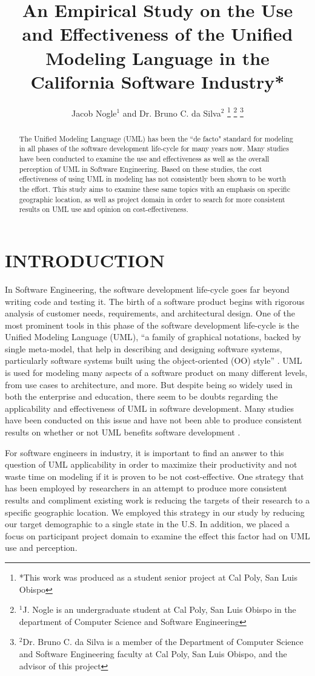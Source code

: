 \documentclass[letterpaper, 10 pt, conference]{ieeeconf}  %
\title{\LARGE \bf
An Empirical Study on the Use and Effectiveness of the Unified Modeling Language in the California Software Industry*
}
\author{Jacob Nogle$^{1}$ and Dr. Bruno C. da Silva$^{2}$%
\thanks{*This work was produced as a student senior project at Cal Poly, San Luis Obispo}%
\thanks{$^{1}$J. Nogle is an undergraduate 	student at Cal Poly, San Luis Obispo in the department of Computer Science and Software Engineering}%
\thanks{$^{2}$Dr. Bruno C. da Silva is a member of the Department of Computer Science and Software Engineering faculty at Cal Poly, San Luis Obispo, and the advisor of this project}%
}
\begin{document}
\maketitle
\thispagestyle{empty}
\pagestyle{empty}


\begin{abstract}

The Unified Modeling Language (UML) has been the ``de facto" standard for modeling in all phases of the software development life-cycle for many years now. Many studies have been conducted to examine the use and effectiveness as well as the overall perception of UML in Software Engineering. Based on these studies, the cost effectiveness of using UML in modeling has not consistently been shown to be worth the effort. This study aims to examine these same topics with an emphasis on specific geographic location, as well as project domain in order to search for more consistent results on UML use and opinion on cost-effectiveness.

\end{abstract}

\section{INTRODUCTION}

In Software Engineering, the software development life-cycle goes far beyond writing code and testing it. The birth of a software product begins with rigorous analysis of customer needs, requirements, and architectural design. One of the most prominent tools in this phase of the software development life-cycle is the Unified Modeling Language (UML), ``a family of graphical notations, backed by single meta-model, that help in describing and designing software systems, particularly software systems built using the object-oriented (OO) style'' \cite{fowler}. UML is used for modeling many aspects of a software product on many different levels, from use cases to architecture, and more.  But despite being so widely used in both the enterprise and education, there seem to be doubts regarding the applicability and effectiveness of UML in software development. Many studies have been conducted on this issue and have not been able to produce consistent results on whether or not UML benefits software development \cite{c2}.

For software engineers in industry, it is important to find an answer to this question of UML applicability in order to maximize their productivity and not waste time on modeling if it is proven to be not cost-effective. One strategy that has been employed by researchers in an attempt to produce more consistent results and compliment existing work is reducing the targets of their research to a specific geographic location. We employed this strategy in our study by reducing our target demographic to a single state in the U.S. In addition, we placed a focus on participant project domain to examine the effect this factor had on UML use and perception.
\end{document}
